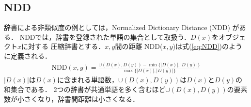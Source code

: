 




\subsection{NDD} %
\label{sub:ndd}

辞書による非類似度の例としては，Normalized Dictionary Distance (NDD) \cite{NDD} がある．
NDDでは，辞書を登録された単語の集合として取扱う．$D(x)$をオブジェクト$x$に対する
圧縮辞書とする．$x,y$間の距離 NDD($x,y$)は式(\ref{eq:NDD})のように定義される．
\begin{eqnarray}
\mathrm{NDD}(x,y) = \frac{ \cup(D(x),D(y)) - \min\{|D(x)|,|D(y)|\} }{ \max\{|D(x)|,|D(y)|\} }
\label{eq:NDD}
\end{eqnarray}
$|D(x)|$は$D(x)$に含まれる単語数，$\cup(D(x),D(y))$は$D(x)$と$D(y)$の和集合である．
2つの辞書が共通単語を多く含むほど$\cup(D(x),D(y))$の要素数が小さくなり，辞書間距離は小さくなる．

